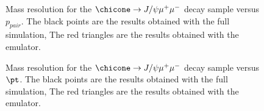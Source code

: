 %
\begin{figure}[htb!]
\begin{center}
\caption{\small Mass resolution for the $\chicone \rightarrow J/\psi
  \mu^+ \mu^-$ decay sample versus $p_{pair}$. The black points are
  the results obtained with the full simulation, The red triangles are the results
  obtained with the emulator.  }
\label{fig:sigmappair}
\end{center}
\end{figure}
%
\begin{figure}[htb!]
\begin{center}
\caption{\small Mass resolution for the $\chicone \rightarrow J/\psi
  \mu^+ \mu^-$ decay sample versus $\pt$.  The black points are
  the results obtained with the full simulation, The red triangles are the results
  obtained with the emulator. }
\label{fig:sigmapt}
\end{center}
\end{figure}
